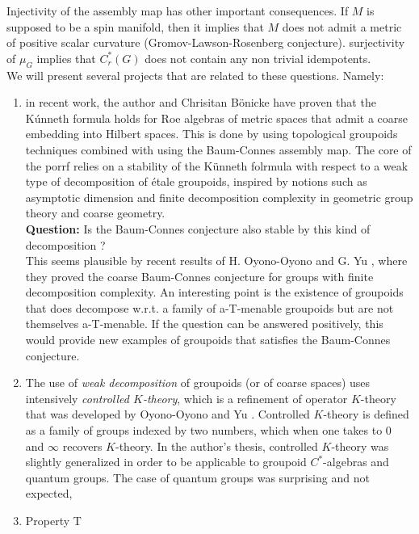 Injectivity of the assembly map has other important consequences. If $M$ is supposed to be a spin manifold, then it implies that $M$ does not admit a metric of positive scalar curvature (Gromov-Lawson-Rosenberg conjecture). surjectivity of $\mu_G$ implies that $C^*_r(G)$ does not contain any non trivial idempotents.\\

We will present several projects that are related to these questions. Namely:
\begin{enumerate}
\item in recent work, the author and Chrisitan B\"onicke have proven that the K\'unneth formula holds for Roe algebras of metric spaces that admit a coarse embedding into Hilbert spaces. This is done by using topological groupoids techniques combined with using the Baum-Connes assembly map. The core of the porrf relies on a stability of the K\"unneth folrmula with respect to a weak type of decomposition of \'etale groupoids, inspired by notions such as asymptotic dimension and finite decomposition complexity in geometric group theory and coarse geometry. \\

\textbf{Question:} Is the Baum-Connes conjecture also stable by this kind of decomposition ?\\

This seems plausible by recent results of H. Oyono-Oyono and G. Yu \cite{OY3}, where they proved the coarse Baum-Connes conjecture for groups with finite decomposition complexity. An interesting point is the existence of groupoids that does decompose w.r.t. a family of a-T-menable groupoids but are not themselves a-T-menable. If the question can be answered positively, this would provide new examples of groupoids that satisfies the Baum-Connes conjecture.     

\item The use of \textit{weak decomposition} of groupoids (or of coarse spaces) uses intensively \textit{controlled $K$-theory}, which is a refinement of operator $K$-theory that was developed by Oyono-Oyono and Yu \cite{OY2}. Controlled $K$-theory is defined as a family of groups indexed by two numbers, which when one takes to $0$ and $\infty$ recovers $K$-theory. In the author's thesis, controlled $K$-theory was slightly generalized in order to be applicable to groupoid $C^*$-algebras and quantum groups. The case of quantum groups was surprising and not expected,  

\item Property T
 
\end{enumerate}

